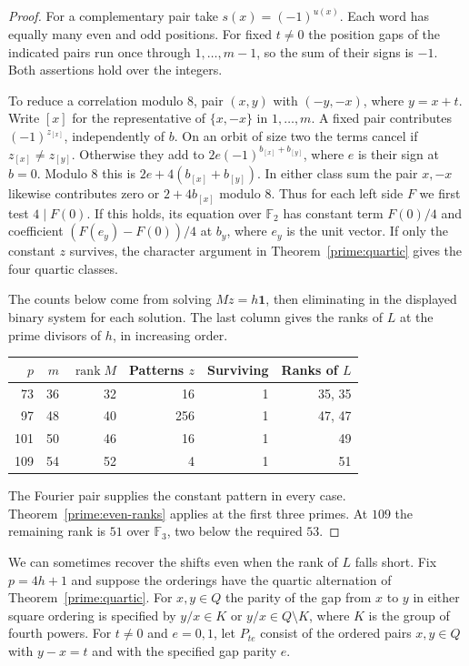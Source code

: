 \documentclass[11pt,a4paper]{article}
\numberwithin{equation}{section}
\begin{document}
\begin{proof}
For a complementary pair take $s(x)=(-1)^{u(x)}$. Each word has equally many even and odd positions. For fixed $t\ne0$ the position gaps of the indicated pairs run once through $1,\ldots,m-1$, so the sum of their signs is $-1$. Both assertions hold over the integers.

To reduce a correlation modulo $8$, pair $(x,y)$ with $(-y,-x)$, where $y=x+t$. Write $[x]$ for the representative of $\{x,-x\}$ in $1,\ldots,m$. A fixed pair contributes $(-1)^{z_{[x]}}$, independently of $b$. On an orbit of size two the terms cancel if $z_{[x]}\ne z_{[y]}$. Otherwise they add to $2e(-1)^{b_{[x]}+b_{[y]}}$, where $e$ is their sign at $b=0$. Modulo $8$ this is $2e+4(b_{[x]}+b_{[y]})$. In either class sum the pair $x,-x$ likewise contributes zero or $2+4b_{[x]}$ modulo $8$. Thus for each left side $F$ we first test $4\mid F(0)$. If this holds, its equation over $\mathbb F_2$ has constant term $F(0)/4$ and coefficient $(F(e_y)-F(0))/4$ at $b_y$, where $e_y$ is the unit vector. If only the constant $z$ survives, the character argument in Theorem~\ref{prime:quartic} gives the four quartic classes.

The counts below come from solving $Mz=h\mathbf1$, then eliminating in the displayed binary system for each solution. The last column gives the ranks of $L$ at the prime divisors of $h$, in increasing order.
\begin{center}
\begin{tabular}{rrrrrr}
\toprule
$p$ & $m$ & $\operatorname{rank} M$ & Patterns $z$ & Surviving & Ranks of $L$\\
\midrule
73 & 36 & 32 & 16 & 1 & 35, 35\\
97 & 48 & 40 & 256 & 1 & 47, 47\\
101 & 50 & 46 & 16 & 1 & 49\\
109 & 54 & 52 & 4 & 1 & 51\\
\bottomrule
\end{tabular}
\end{center}
The Fourier pair supplies the constant pattern in every case. Theorem~\ref{prime:even-ranks} applies at the first three primes. At $109$ the remaining rank is $51$ over $\mathbb F_3$, two below the required $53$.
\end{proof}

We can sometimes recover the shifts even when the rank of $L$ falls short. Fix $p=4h+1$ and suppose the orderings have the quartic alternation of Theorem~\ref{prime:quartic}. For $x,y\in Q$ the parity of the gap from $x$ to $y$ in either square ordering is specified by $y/x\in K$ or $y/x\in Q\setminus K$, where $K$ is the group of fourth powers. For $t\ne0$ and $e=0,1$, let $P_{te}$ consist of the ordered pairs $x,y\in Q$ with $y-x=t$ and with the specified gap parity $e$.
\end{document}

